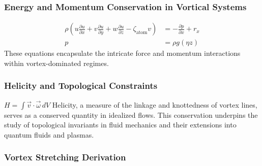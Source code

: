 \documentclass[a4paper,12pt]{article}
\begin{document}
    \subsubsection*{Energy and Momentum Conservation in Vortical Systems}
    \begin{align}
        \rho \left( u \frac{\partial u}{\partial x} + v \frac{\partial u}{\partial y} + w \frac{\partial u}{\partial z} - \zeta_\text{atom} v \right) &= -\frac{\partial p}{\partial x} + r_x \\
        p &= \rho g(\eta z)
    \end{align}
    These equations encapsulate the intricate force and momentum interactions within vortex-dominated regimes.


\subsubsection*{Helicity and Topological Constraints}
$H = \int \vec{v} \cdot \vec{\omega} \, dV$
 Helicity, a measure of the linkage and knottedness of vortex lines, serves as a conserved quantity in idealized flows. This conservation underpins the study of topological invariants in fluid mechanics and their extensions into quantum fluids and plasmas.

 \subsubsection{Vortex Stretching Derivation}
\end{document}
